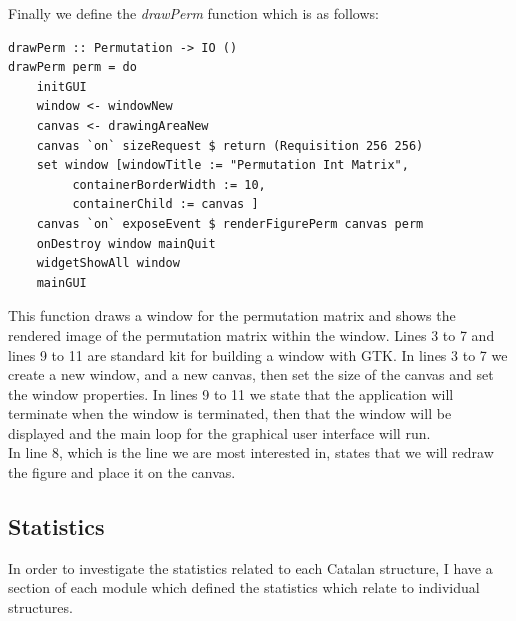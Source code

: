 \documentclass[12pt]{article}
\begin{document}
Finally we define the {\it drawPerm} function which is as follows:
\begin{lstlisting}
drawPerm :: Permutation -> IO ()
drawPerm perm = do
	initGUI
	window <- windowNew
	canvas <- drawingAreaNew
	canvas `on` sizeRequest $ return (Requisition 256 256)
	set window [windowTitle := "Permutation Int Matrix",
		 containerBorderWidth := 10,
		 containerChild := canvas ]
	canvas `on` exposeEvent $ renderFigurePerm canvas perm
	onDestroy window mainQuit
	widgetShowAll window
	mainGUI
\end{lstlisting}
This function draws a window for the permutation matrix and shows the rendered image of the permutation matrix within the window. Lines 3 to 7 and lines 9 to 11 are standard kit for building a window with GTK. In lines 3 to 7 we create a new window, and a new canvas, then set the size of the canvas and set the window properties. In lines 9 to 11 we state that the application will terminate when the window is terminated, then that the window will be displayed and the main loop for the graphical user interface will run.\\
In line 8, which is the line we are most interested in, states that we will redraw the figure and place it on the canvas.


\subsection{Statistics}
In order to investigate the statistics related to each Catalan structure, I have a section of each module which defined the statistics which relate to individual structures.\\
\end{document}
